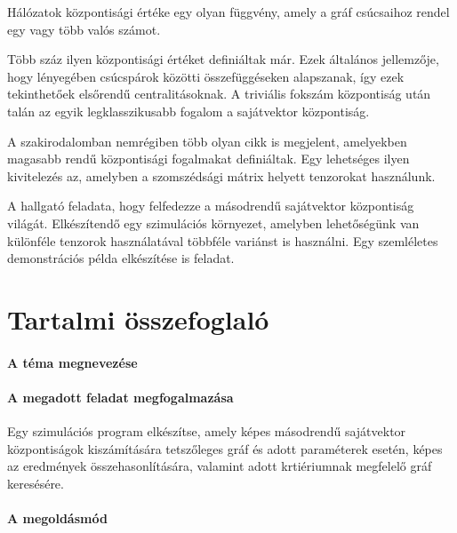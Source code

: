 \documentclass[12pt,numbers=noenddot]{report}
\begin{document}
Hálózatok központisági értéke egy olyan függvény, amely a gráf
csúcsaihoz rendel egy vagy több valós számot.

Több száz ilyen központisági értéket definiáltak már. Ezek általános
jellemzője, hogy lényegében csúcspárok közötti összefüggéseken
alapszanak, így ezek tekinthetőek elsőrendű centralitásoknak.
A triviális fokszám központiság után talán az egyik legklasszikusabb
fogalom a sajátvektor központiság.

A szakirodalomban nemrégiben több olyan cikk is megjelent, amelyekben
magasabb rendű központisági fogalmakat definiáltak. \cite{second-order-framework}
Egy lehetséges ilyen kivitelezés az, amelyben a szomszédsági mátrix
helyett tenzorokat használunk.

A hallgató feladata, hogy felfedezze a másodrendű sajátvektor
központiság világát. Elkészítendő egy szimulációs környezet, amelyben
lehetőségünk van különféle tenzorok használatával többféle variánst is
használni. Egy szemléletes demonstrációs példa elkészítése is feladat.


\chapter*{Tartalmi összefoglaló}

\subsubsection*{A téma megnevezése}

\cim

\subsubsection*{A megadott feladat megfogalmazása}

Egy szimulációs program elkészítse, amely képes másodrendű sajátvektor
központiságok kiszámítására tetszőleges gráf és adott paraméterek esetén, 
képes az eredmények összehasonlítására, valamint adott krtiériumnak megfelelő
gráf keresésére.

\subsubsection*{A megoldásmód}
\end{document}
